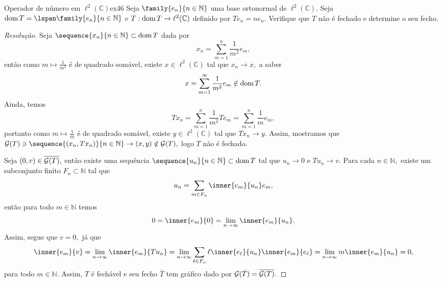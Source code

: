 \begin{exercício}{Operador de número em \(\ell^2(\mathbb{C})\)}{ex46}
  Seja \(\family{e_n}{n\in \mathbb{N}}\) uma base ortonormal de \(\ell^2(\mathbb{C}).\) Seja \(\dom{T} = \lspan\family{e_n}{n\in\mathbb{N}}\) e \(T : \operatorname{dom}{T} \to \ell^2(\mathbb{C})\) definido por \(Te_n = n e_n.\) Verifique que \(T\) não é fechado e determine o seu fecho.
\end{exercício}
\begin{proof}[Resolução]
  Seja \(\sequence{x_n}{n\in\mathbb{N}} \subset \dom{T}\) dada por
  \begin{equation*}
    x_n = \sum_{m = 1}^n \frac{1}{m^2} e_m,
  \end{equation*}
  então como \(m \mapsto \frac{1}{m^2}\) é de quadrado somável, existe \(x \in \ell^2(\mathbb{C})\) tal que \(x_n \to x,\) a saber
  \begin{equation*}
    x = \sum_{m = 1}^\infty \frac{1}{m^2} e_m \notin \operatorname{dom}{T}.
  \end{equation*}
  Ainda, temos
  \begin{equation*}
    Tx_n = \sum_{m = 1}^n \frac{1}{m^2} Te_m = \sum_{m = 1}^n \frac{1}{m} e_m,
  \end{equation*}
  portanto como \(m \mapsto \frac{1}{m}\) é de quadrado somável, existe \(y \in \ell^2(\mathbb{C})\) tal que \(Tx_n \to y.\) Assim, mostramos que \(\graph{T} \ni \sequence{(x_n, Tx_n)}{n\in\mathbb{N}} \to (x, y) \notin \graph{T},\) logo \(T\) não é fechado.

  Seja \((0,v) \in \overline{\mathcal{G}(T)},\) então existe uma sequência \(\sequence{u_n}{n\in\mathbb{N}} \subset \dom{T}\) tal que \(u_n \to 0\) e \(Tu_n \to v.\) Para cada \(n \in \mathbb{N},\) existe um subconjunto finito \(F_n \subset \mathbb{N}\) tal que
  \begin{equation*}
    u_n = \sum_{m \in F_n} \inner{e_m}{u_n}e_m,
  \end{equation*}
  então para todo \(m \in \mathbb{N}\) temos
  \begin{equation*}
    0 = \inner{e_m}{0} = \lim_{n \to \infty} \inner{e_m}{u_n}.
  \end{equation*}
  Assim, segue que \(v = 0,\) já que
  \begin{equation*}
    \inner{e_m}{v} = \lim_{n \to \infty} \inner{e_m}{Tu_n} = \lim_{n\to \infty} \sum_{\ell \in F_n} \ell\inner{e_\ell}{u_n}\inner{e_m}{e_\ell} = \lim_{n\to\infty} m \inner{e_m}{u_n} = 0,
  \end{equation*}
  para todo \(m \in \mathbb{N}.\) Assim, \(T\) é fechável e seu fecho \(\bar{T}\) tem gráfico dado por \(\mathcal{G}(\bar{T}) = \overline{\mathcal{G}(T)}.\)


\end{proof}
